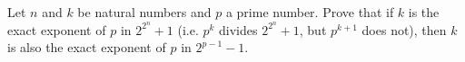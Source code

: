 Let $n$ and $k$ be natural numbers and $p$ a prime number. Prove that if $k$ is the exact exponent of $p$ in $2^{2^n}+1$ (i.e. $p^k$ divides $2^{2^n}+1$, but $p^{k+1}$ does not), then $k$ is also the exact exponent of $p$ in $2^{p-1}-1$.